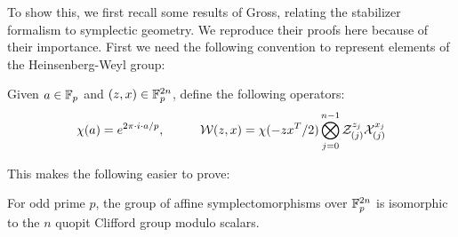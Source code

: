 To show this, we  first recall some results of Gross, relating the stabilizer formalism to symplectic geometry.  We reproduce their proofs here because of their importance.  First we need the following convention to represent elements of the Heinsenberg-Weyl group:
\begin{definition}
Given $a \in \mathbb{F}_p$ and $(z,x )\in \mathbb{F}_p^{2n}$, define the following operators:
$$
\chi(a) = e^{2\pi\cdot i \cdot a/p}, \hspace*{1cm} {\mathcal W}(z,x)=\chi(-zx^T/2)\bigotimes_{j=0}^{n-1}\mathcal{Z}_{(j)}^{z_j}\mathcal{X}_{(j)}^{x_j}
$$
\end{definition}
This makes the following easier to prove:
\begingroup\allowdisplaybreaks
\begin{lemma}
For odd prime $p$, the group of affine symplectomorphisms over  $\mathbb{F}_p^{2n}$ is isomorphic to the $n$ quopit Clifford group modulo scalars.
\end{lemma}
